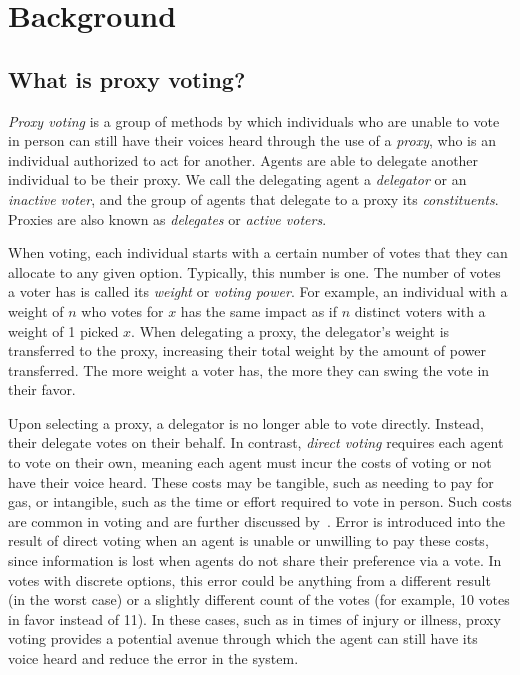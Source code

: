 \section{Background}\label{sec:background}

\subsection{What is proxy voting?}\label{subsec:what-is-proxy-voting?}
\textit{Proxy voting} is a group of methods by which individuals who are unable to
vote in person can still have their voices heard through the use of a \textit{proxy},
who is an individual authorized to act for another.
Agents are able to delegate another individual to be their proxy.
We call the delegating agent a \textit{delegator} or an \textit{inactive voter}, and
the group of agents that delegate to a proxy its \textit{constituents}.
Proxies are also known as \textit{delegates} or \textit{active voters}.

When voting, each individual starts with a certain number of votes that they can
allocate to any given option.
Typically, this number is one.
The number of votes a voter has is called its \textit{weight} or \textit{voting power}.
For example, an individual with a weight of $n$ who votes for $x$ has the same impact
as if $n$ distinct voters with a weight of 1 picked $x$.
When delegating a proxy, the delegator's weight is transferred to the proxy,
increasing their total weight by the amount of power transferred.
The more weight a voter has, the more they can swing the vote in their favor.

Upon selecting a proxy, a delegator is no longer able to vote directly.
Instead, their delegate votes on their behalf.
In contrast, \textit{direct voting} requires each agent to vote on their own, meaning
each agent must incur the costs of voting or not have their voice heard.
These costs may be tangible, such as needing to pay for gas, or intangible, such as
the time or effort required to vote in person.
Such costs are common in voting and are further discussed by~\cite{Gershtein2019}.
Error is introduced into the result of direct voting when an agent is unable or
unwilling to pay these costs, since information is lost when agents do not share
their preference via a vote.
In votes with discrete options, this error could be anything from a different result
(in the worst case) or a slightly different count of the votes (for example, 10
votes in favor instead of 11).
In these cases, such as in times of injury or illness, proxy voting provides a
potential avenue through which the agent can still have its voice heard and reduce
the error in the system.

